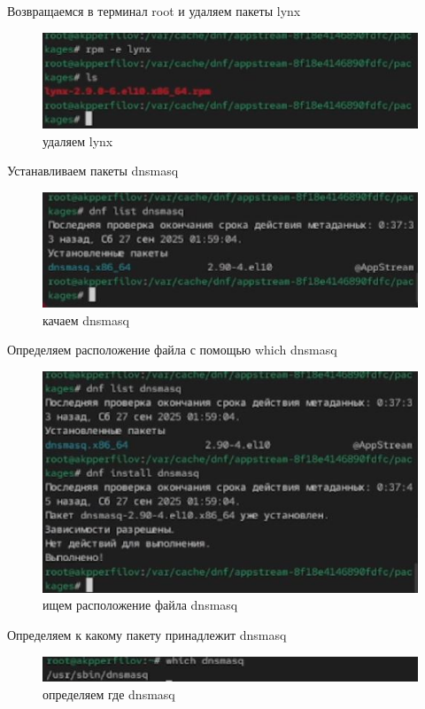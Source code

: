 \documentclass[
  english,
  russian,
  12pt,
  a4paper,
  DIV=11,
  numbers=noendperiod]{scrreprt}
\begin{document}
Возвращаемся в терминал root и удаляем пакеты lynx

\begin{figure}

{\centering \includegraphics[width=0.71\linewidth,height=\textheight,keepaspectratio]{image/31.jpg}

}

\caption{удаляем lynx}

\end{figure}%

Устанавливаем пакеты dnsmasq

\begin{figure}

{\centering \includegraphics[width=0.3\linewidth,height=\textheight,keepaspectratio]{image/32.jpg}

}

\caption{качаем dnsmasq}

\end{figure}%

Определяем расположение файла с помощью which dnsmasq

\begin{figure}

{\centering \includegraphics[width=0.3\linewidth,height=\textheight,keepaspectratio]{image/33.jpg}

}

\caption{ищем расположение файла dnsmasq}

\end{figure}%

Определяем к какому пакету принадлежит dnsmasq

\begin{figure}

{\centering \includegraphics[width=0.3\linewidth,height=\textheight,keepaspectratio]{image/34.jpg}

}

\caption{определяем где dnsmasq}

\end{figure}%
\end{document}
